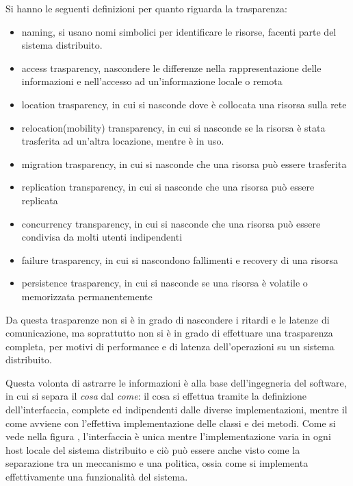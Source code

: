 \documentclass[a4paper,12pt, oneside]{book}
\begin{document}
Si hanno le seguenti definizioni per quanto riguarda la trasparenza:
\begin{itemize}
    \item naming, si usano nomi simbolici per identificare le risorse,
            facenti parte del sistema distribuito.
    \item access trasparency, nascondere le differenze nella rappresentazione 
        delle informazioni e nell'accesso ad un'informazione locale o remota 
    \item location trasparency, in cui si nasconde dove è collocata una risorsa sulla rete
    \item  relocation(mobility) transparency, in cui si nasconde se la risorsa è stata
        trasferita ad un'altra locazione, mentre è in uso.
    \item migration trasparency, in cui si nasconde che una risorsa può essere trasferita
    \item replication transparency, in cui si nasconde che una risorsa può essere replicata
    \item concurrency transparency, in cui si nasconde che una risorsa può essere condivisa
        da molti utenti indipendenti
    \item failure trasparency, in cui si nascondono fallimenti e recovery di una risorsa
    \item persistence trasparency, in cui si nasconde se una risorsa
                  è volatile o memorizzata permanentemente
\end{itemize}
Da questa trasparenze non si è in grado di nascondere i ritardi e le latenze di comunicazione, ma
soprattutto non si è in grado di effettuare una trasparenza completa, per motivi di performance
e di latenza dell'operazioni su un sistema distribuito.

Questa volonta di astrarre le informazioni è alla base dell'ingegneria del software, in cui si separa
il \textit{cosa} dal \textit{come}: il cosa si effettua tramite la definizione dell'interfaccia, complete
ed indipendenti dalle diverse implementazioni, mentre il come avviene con l'effettiva implementazione
delle classi e dei metodi.\newline
Come si vede nella figura \href{figura:interfaccia}, l'interfaccia è unica mentre l'implementazione
varia in ogni host locale del sistema distribuito e ciò può essere anche visto come la separazione
tra un meccanismo e una politica, ossia come si implementa effettivamente una funzionalità del sistema.
\end{document}

